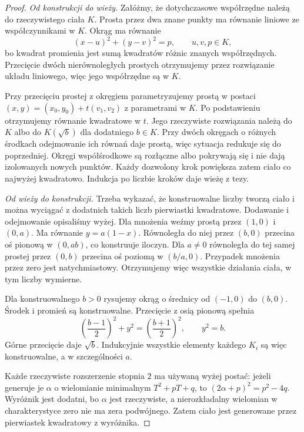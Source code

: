 \documentclass[11pt,a4paper,oneside]{book}
\numberwithin{equation}{section}
\theoremstyle{plain}
\theoremstyle{definition}
\theoremstyle{remark}
\begin{document}
\begin{proof}
\emph{Od konstrukcji do wieży.} Załóżmy, że dotychczasowe współrzędne należą do rzeczywistego ciała $K$. Prosta przez dwa znane punkty ma równanie liniowe ze współczynnikami w $K$. Okrąg ma równanie
\[
(x-u)^2+(y-v)^2=p,\qquad u,v,p\in K,
\]
bo kwadrat promienia jest sumą kwadratów różnic znanych współrzędnych. Przecięcie dwóch nierównoległych prostych otrzymujemy przez rozwiązanie układu liniowego, więc jego współrzędne są w $K$.

Przy przecięciu prostej z okręgiem parametryzujemy prostą w postaci $(x,y)=(x_0,y_0)+t(v_1,v_2)$ z parametrami w $K$. Po podstawieniu otrzymujemy równanie kwadratowe w $t$. Jego rzeczywiste rozwiązania należą do $K$ albo do $K(\sqrt b)$ dla dodatniego $b\in K$. Przy dwóch okręgach o różnych środkach odejmowanie ich równań daje prostą, więc sytuacja redukuje się do poprzedniej. Okręgi współśrodkowe są rozłączne albo pokrywają się i nie dają izolowanych nowych punktów. Każdy dozwolony krok powiększa zatem ciało co najwyżej kwadratowo. Indukcja po liczbie kroków daje wieżę z tezy.

\emph{Od wieży do konstrukcji.} Trzeba wykazać, że konstruowalne liczby tworzą ciało i można wyciągać z dodatnich takich liczb pierwiastki kwadratowe. Dodawanie i odejmowanie opisaliśmy wyżej. Dla mnożenia weźmy prostą przez $(1,0)$ i $(0,a)$. Ma równanie $y=a(1-x)$. Równoległa do niej przez $(b,0)$ przecina oś pionową w $(0,ab)$, co konstruuje iloczyn. Dla $a\ne0$ równoległa do tej samej prostej przez $(0,b)$ przecina oś poziomą w $(b/a,0)$. Przypadek mnożenia przez zero jest natychmiastowy. Otrzymujemy więc wszystkie działania ciała, w tym liczby wymierne.

Dla konstruowalnego $b>0$ rysujemy okrąg o średnicy od $(-1,0)$ do $(b,0)$. Środek i promień są konstruowalne. Przecięcie z osią pionową spełnia
\[
\left(\frac{b-1}{2}\right)^2+y^2=\left(\frac{b+1}{2}\right)^2,
\qquad y^2=b.
\]
Górne przecięcie daje $\sqrt b$. Indukcyjnie wszystkie elementy każdego $K_i$ są więc konstruowalne, a w szczególności $a$.

Każde rzeczywiste rozszerzenie stopnia $2$ ma używaną wyżej postać: jeżeli generuje je $\alpha$ o wielomianie minimalnym $T^2+pT+q$, to $(2\alpha+p)^2=p^2-4q$. Wyróżnik jest dodatni, bo $\alpha$ jest rzeczywiste, a nierozkładalny wielomian w charakterystyce zero nie ma zera podwójnego. Zatem ciało jest generowane przez pierwiastek kwadratowy z wyróżnika.
\end{proof}
\end{document}
